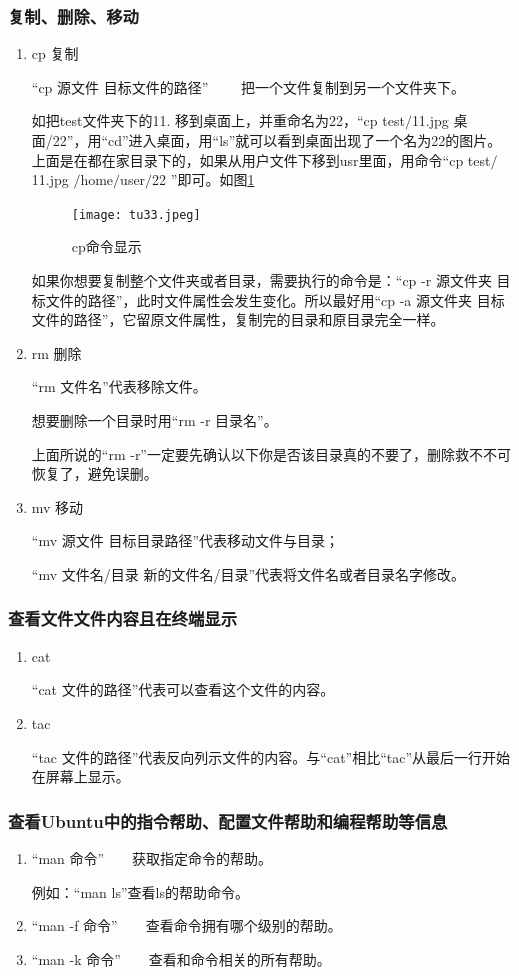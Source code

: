 \documentclass{article}
\begin{document}
\subsubsection{复制、删除、移动}
\begin{enumerate}
\item cp 复制

“cp 源文件 目标文件的路径”  ~~~~把一个文件复制到另一个文件夹下。

如把test文件夹下的11. 移到桌面上，并重命名为22，“cp test$\slash$11.jpg 桌面/22”，用“cd”进入桌面，用“ls”就可以看到桌面出现了一个名为22的图片。上面是在都在家目录下的，如果从用户文件下移到usr里面，用命令“cp test$\slash$11.jpg $\slash$home$\slash$user$\slash$22 ”即可。如图\ref{tu33}
\begin{figure}[!htb] %
\centering
\texttt{[image: tu33.jpeg]}
\caption{\small cp命令显示}
\label{tu33}
\end{figure} 

 如果你想要复制整个文件夹或者目录，需要执行的命令是：“cp -r 源文件夹 目标文件的路径”，此时文件属性会发生变化。所以最好用“cp -a 源文件夹 目标文件的路径”，它留原文件属性，复制完的目录和原目录完全一样。

\item rm 删除

“rm 文件名”代表移除文件。

想要删除一个目录时用“rm -r 目录名”。

{\color{blue}上面所说的“rm -r”一定要先确认以下你是否该目录真的不要了，删除救不不可恢复了，避免误删}。

\item mv 移动

“mv 源文件 目标目录路径”代表移动文件与目录；

“mv 文件名/目录 新的文件名/目录”代表将文件名或者目录名字修改。
\end{enumerate}
\subsubsection{查看文件文件内容且在终端显示}
\begin{enumerate}
\item cat

“cat 文件的路径”代表可以查看这个文件的内容。

\item tac

“tac 文件的路径”代表反向列示文件的内容。与“cat”相比“tac”从最后一行开始在屏幕上显示。
\end{enumerate}
\subsubsection{查看Ubuntu中的指令帮助、配置文件帮助和编程帮助等信息}
\begin{enumerate}
\item “man 命令”~~~~获取指定命令的帮助。

例如：“man ls”查看ls的帮助命令。

\item “man -f 命令”~~~~查看命令拥有哪个级别的帮助。

\item “man -k 命令”~~~~查看和命令相关的所有帮助。
\end{enumerate}
\end{document}
